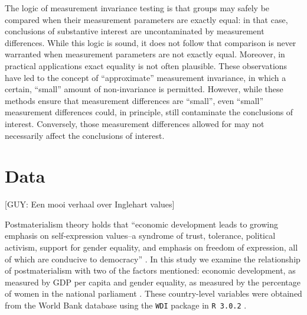\documentclass[letterpaper,12pt]{article}
\begin{document}
\noindent

The logic of measurement invariance testing is that groups may safely be compared when their measurement parameters are exactly equal: in that case, conclusions of substantive interest are uncontaminated by measurement differences. While this logic is sound, it does not follow that comparison is never warranted when measurement parameters are not exactly equal. Moreover, in practical applications exact equality is not often plausible. These observations have led to the concept of ``approximate'' measurement  invariance, in which a certain, ``small'' amount of non-invariance is permitted. 
However, while these methods ensure that measurement differences are ``small'', even ``small'' measurement differences could, in principle, still contaminate the conclusions of interest. Conversely, those measurement differences allowed for may not necessarily affect the conclusions of interest. 


\citep{muthen2012bayesian}
\citep{schoot2013facing}

\citep{muthen2014alignment}


\section{Data}

[GUY: Een mooi verhaal over Inglehart values]

Postmaterialism theory holds that ``economic development leads to growing emphasis on self-expression values--a syndrome of trust, tolerance, political activism, support for gender equality, and emphasis on freedom of expression, all of which are conducive to democracy'' \citep[p. 557]{inglehart2010changing}. In this study we examine the relationship of postmaterialism with two of the factors mentioned: economic development, as measured by GDP per capita \citep[following][]{inglehart1997modernization} and gender equality, as measured by the percentage of women in the national parliament \citep[following][]{inglehart2002gender}. These country-level variables were obtained from the World Bank database using the \texttt{WDI} package \citep{arel2013WDI} in \texttt{R 3.0.2} \citep{Rlanguage}.


\end{document}
